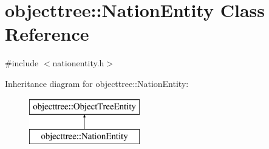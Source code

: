 \hypertarget{classobjecttree_1_1_nation_entity}{}\section{objecttree\+::Nation\+Entity Class Reference}
\label{classobjecttree_1_1_nation_entity}


{\ttfamily \#include $<$nationentity.\+h$>$}

Inheritance diagram for objecttree\+::Nation\+Entity\+:\begin{figure}[H]
\begin{center}
\leavevmode
\includegraphics[height=2.000000cm]{d3/d88/classobjecttree_1_1_nation_entity}
\end{center}
\end{figure}
